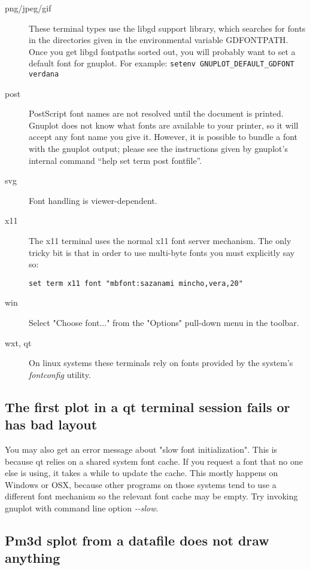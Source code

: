 \documentclass[letter,11pt]{article}
\begin{document}
{\begin{description}
\item [{png/jpeg/gif}] These terminal types use the libgd support library, which
searches for fonts in the directories given in the environmental variable
GDFONTPATH. Once you get libgd fontpaths sorted out, you will probably
want to set a default font for gnuplot.
For example: \verb+setenv GNUPLOT_DEFAULT_GDFONT verdana+
\item [{post}] PostScript font names are not resolved until the document
is printed. Gnuplot does not know what fonts are available to your
printer, so it will accept any font name you give it. However, it
is possible to bundle a font with the gnuplot output; please see the
instructions given by gnuplot's internal command {}``help set term
post fontfile''.
\item [{svg}] Font handling is viewer-dependent.
\item [{x11}] The x11 terminal uses the normal x11 font server mechanism.
The only tricky bit is that in order to use multi-byte fonts you must
explicitly say so:
\small\begin{verbatim}
set term x11 font "mbfont:sazanami mincho,vera,20"
\end{verbatim}\normalsize
\item [{win}] Select "Choose font..." from the "Options" pull-down menu
in the toolbar.
\item [{wxt, qt}] On linux systems these terminals rely on fonts provided
by the system's \textit{fontconfig} utility.
\end{description}

\subsection{The first plot in a qt terminal session fails or has bad layout}

You may also get an error message about "slow font initialization".
This is because qt relies on a shared system font cache.
If you request a font that no one else is using, it takes a while to
update the cache.  This mostly happens on Windows or OSX, because other
programs on those systems tend to use a different font mechanism so the 
relevant font cache may be empty.
Try invoking gnuplot with command line option {\em -\@-slow}.

\subsection{Pm3d splot from a datafile does not draw anything}

}
\end{document}
